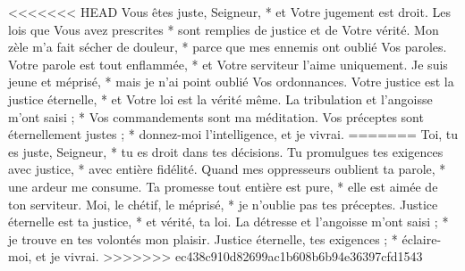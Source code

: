 <<<<<<< HEAD
Vous êtes juste, Seigneur, * et Votre jugement est droit.
\versseparator
Les lois que Vous avez prescrites * sont remplies de justice et de Votre vérité.
\versseparator
Mon zèle m'a fait sécher de douleur, * parce que mes ennemis ont oublié Vos paroles.
\versseparator
Votre parole est tout enflammée, * et Votre serviteur l'aime uniquement.
\versseparator
Je suis jeune et méprisé, * mais je n'ai point oublié Vos ordonnances.
\versseparator
Votre justice est la justice éternelle, * et Votre loi est la vérité même.
\versseparator
La tribulation et l'angoisse m'ont saisi ; * Vos commandements sont ma méditation.
\versseparator
Vos préceptes sont éternellement justes ; * donnez-moi l'intelligence, et je vivrai.
=======
Toi, tu es juste, Seigneur, *
tu es droit dans tes décisions.
\versseparator
Tu promulgues tes exigences avec justice, *
avec entière fidélité.
\versseparator
Quand mes oppresseurs oublient ta parole, *
une ardeur me consume.
\versseparator
Ta promesse tout entière est pure, *
elle est aimée de ton serviteur.
\versseparator
Moi, le chétif, le méprisé, *
je n’oublie pas tes préceptes.
\versseparator
Justice éternelle est ta justice, *
et vérité, ta loi.
\versseparator
La détresse et l’angoisse m’ont saisi ; *
je trouve en tes volontés mon plaisir.
\versseparator
Justice éternelle, tes exigences ; *
éclaire-moi, et je vivrai.
>>>>>>> ec438c910d82699ac1b608b6b94e36397cfd1543

